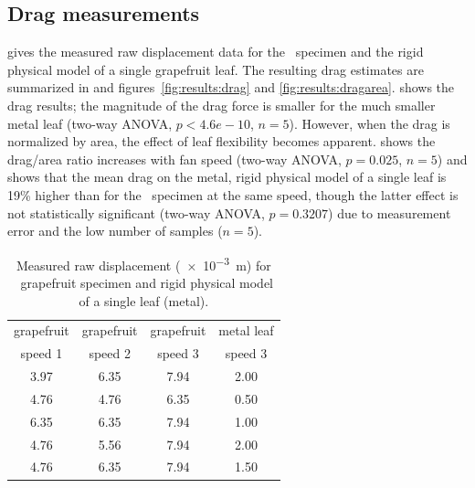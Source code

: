 \subsection{Drag measurements}
 gives the measured raw displacement data for the \Cxparadisi\ specimen and the rigid physical model of a single grapefruit leaf. The resulting drag estimates are summarized in  and figures~\ref{fig:results:drag} and \ref{fig:results:dragarea}.  shows the drag results; the magnitude of the drag force is smaller for the much smaller metal leaf (two-way ANOVA, $p<4.6e-10$, $n=5$). However, when the drag is normalized by area, the effect of leaf flexibility becomes apparent.  shows the drag/area ratio increases with fan speed (two-way ANOVA, $p=0.025$, $n=5$) and shows that the mean drag on the metal, rigid physical model of a single leaf is 19\% higher than for the \Cxparadisi\ specimen at the same speed, though the latter effect is not statistically significant (two-way ANOVA, $p=0.3207$) due to measurement error and the low number of samples ($n=5$).
\clearpage 
\begin{table}
\caption{Measured raw displacement (\SI{e-3}{\meter}) for \Cxparadisi\ grapefruit specimen and rigid physical model of a single leaf (metal).}
\label{tab:results:displacement}
\begin{center}
\begin{tabular}{cccc}
\toprule
grapefruit & grapefruit & grapefruit & metal leaf \\
speed 1 & speed 2 & speed 3 & speed 3 \\ 
\midrule
3.97 & 6.35 & 7.94 & 2.00 \\ %
4.76 & 4.76 & 6.35 & 0.50 \\
6.35 & 6.35 & 7.94 & 1.00 \\
4.76 & 5.56 & 7.94 & 2.00 \\
4.76 & 6.35 & 7.94 & 1.50 \\
\bottomrule
\end{tabular}
\end{center}
\end{table}
